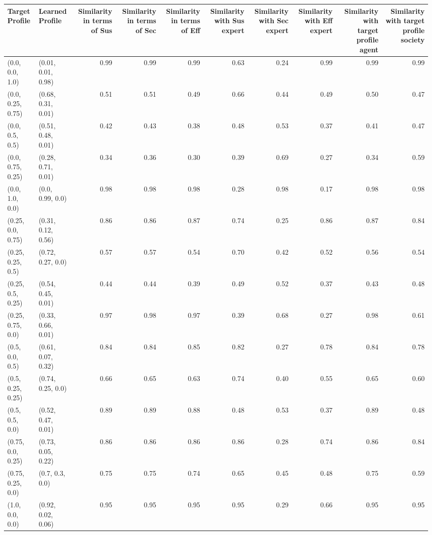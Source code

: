 \begin{tabular}{llrrrrrrrr}
\toprule
Target Profile & Learned Profile & Similarity in terms of Sus & Similarity in terms of Sec & Similarity in terms of Eff & Similarity with Sus expert & Similarity with Sec expert & Similarity with Eff expert & Similarity with target profile agent & Similarity with target profile society \\
\midrule
(0.0, 0.0, 1.0) & (0.01, 0.01, 0.98) & 0.99 & 0.99 & 0.99 & 0.63 & 0.24 & 0.99 & 0.99 & 0.99 \\
(0.0, 0.25, 0.75) & (0.68, 0.31, 0.01) & 0.51 & 0.51 & 0.49 & 0.66 & 0.44 & 0.49 & 0.50 & 0.47 \\
(0.0, 0.5, 0.5) & (0.51, 0.48, 0.01) & 0.42 & 0.43 & 0.38 & 0.48 & 0.53 & 0.37 & 0.41 & 0.47 \\
(0.0, 0.75, 0.25) & (0.28, 0.71, 0.01) & 0.34 & 0.36 & 0.30 & 0.39 & 0.69 & 0.27 & 0.34 & 0.59 \\
(0.0, 1.0, 0.0) & (0.0, 0.99, 0.0) & 0.98 & 0.98 & 0.98 & 0.28 & 0.98 & 0.17 & 0.98 & 0.98 \\
(0.25, 0.0, 0.75) & (0.31, 0.12, 0.56) & 0.86 & 0.86 & 0.87 & 0.74 & 0.25 & 0.86 & 0.87 & 0.84 \\
(0.25, 0.25, 0.5) & (0.72, 0.27, 0.0) & 0.57 & 0.57 & 0.54 & 0.70 & 0.42 & 0.52 & 0.56 & 0.54 \\
(0.25, 0.5, 0.25) & (0.54, 0.45, 0.01) & 0.44 & 0.44 & 0.39 & 0.49 & 0.52 & 0.37 & 0.43 & 0.48 \\
(0.25, 0.75, 0.0) & (0.33, 0.66, 0.01) & 0.97 & 0.98 & 0.97 & 0.39 & 0.68 & 0.27 & 0.98 & 0.61 \\
(0.5, 0.0, 0.5) & (0.61, 0.07, 0.32) & 0.84 & 0.84 & 0.85 & 0.82 & 0.27 & 0.78 & 0.84 & 0.78 \\
(0.5, 0.25, 0.25) & (0.74, 0.25, 0.0) & 0.66 & 0.65 & 0.63 & 0.74 & 0.40 & 0.55 & 0.65 & 0.60 \\
(0.5, 0.5, 0.0) & (0.52, 0.47, 0.01) & 0.89 & 0.89 & 0.88 & 0.48 & 0.53 & 0.37 & 0.89 & 0.48 \\
(0.75, 0.0, 0.25) & (0.73, 0.05, 0.22) & 0.86 & 0.86 & 0.86 & 0.86 & 0.28 & 0.74 & 0.86 & 0.84 \\
(0.75, 0.25, 0.0) & (0.7, 0.3, 0.0) & 0.75 & 0.75 & 0.74 & 0.65 & 0.45 & 0.48 & 0.75 & 0.59 \\
(1.0, 0.0, 0.0) & (0.92, 0.02, 0.06) & 0.95 & 0.95 & 0.95 & 0.95 & 0.29 & 0.66 & 0.95 & 0.95 \\
\bottomrule
\end{tabular}
